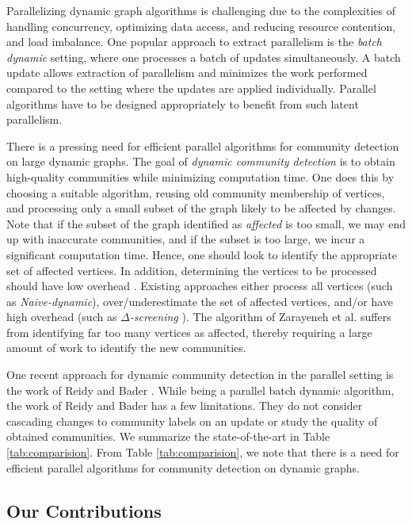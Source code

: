 Parallelizing dynamic graph algorithms is challenging due to the complexities of handling concurrency, optimizing data access, and reducing resource contention, and load imbalance. One popular approach to extract parallelism is the \textit{batch dynamic} setting, where one processes a batch of updates simultaneously. A batch update allows extraction of parallelism and minimizes the work performed compared to the setting where the updates are applied individually. Parallel algorithms have to be designed appropriately to benefit from such latent parallelism.

There is a pressing need for efficient parallel algorithms for community detection on large dynamic graphs. The goal of \textit{dynamic community detection} is to obtain high-quality communities while minimizing computation time. One does this by choosing a suitable algorithm, reusing old community membership of vertices, and processing only a small subset of the graph likely to be affected by changes. Note that if the subset of the graph identified as \textit{affected} is too small, we may end up with inaccurate communities, and if the subset is too large, we incur a significant computation time. Hence, one should look to identify the appropriate set of affected vertices. In addition, determining the vertices to be processed should have low overhead \cite{incr-ramalingam96}. Existing approaches either process all vertices (such as \textit{Naive-dynamic}), over/underestimate the set of affected vertices, and/or have high overhead (such as \textit{$\Delta$-screening} \cite{com-zarayeneh21}). The algorithm of Zarayeneh et al. \cite{com-zarayeneh21} suffers from identifying far too many vertices as affected, thereby requiring a large amount of work to identify the new communities.

One recent approach for dynamic community detection in the parallel setting is the work of Reidy and Bader \cite{com-riedy13}. While being a parallel batch dynamic algorithm, the work of Reidy and Bader \cite{com-riedy13} has a few limitations. They do not consider cascading changes to community labels on an update or study the quality of obtained communities. We summarize the state-of-the-art in Table \ref{tab:comparision}. From Table \ref{tab:comparision}, we note that there is a need for efficient parallel algorithms for community detection on dynamic graphs.




\subsection{Our Contributions}
\label{sec:contribution}

